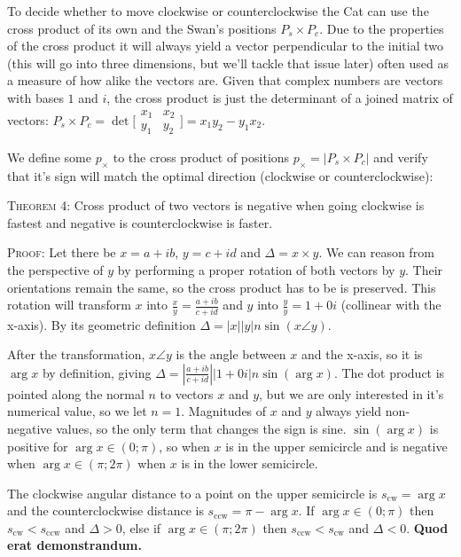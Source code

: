 \documentclass[12pt]{article}
\begin{document}
To decide whether to move clockwise or counterclockwise the Cat can use the cross product of its own and the Swan's positions $P_s \times P_c$. Due to the properties of the cross product it will always yield a vector perpendicular to the initial two (this will go into three dimensions, but we'll tackle that issue later) often used as a measure of how alike the vectors are. Given that complex numbers are vectors with bases $1$ and $i$, the cross product\citep{crossproduct} is just the determinant of a joined matrix of vectors: $P_s \times P_c = \det \bigl[ \begin{smallmatrix} 
	x_1 & x_2\\
	y_1 & y_2 
  \end{smallmatrix} \bigr] = x_1y_2 - y_1x_2$.

We define some $p_\times$ to the cross product of positions $p_\times = |P_s \times P_c|$ and verify that it's sign will match the optimal direction (clockwise or counterclockwise):

\textsc{Theorem 4}: Cross product of two vectors is negative when going clockwise is fastest and negative is counterclockwise is faster.

\textsc{Proof}: 
Let there be $x = a + ib$, $y = c + id$ and $\Delta = x \times y$. We can reason from the perspective of $y$ by performing a proper rotation\citep{rotation} of both vectors by $y$. Their orientations remain the same, so the cross product has to be is preserved. This rotation will transform $x$ into $\frac{x}{y} = \frac{a + ib}{c + id}$ and $y$ into $\frac{y}{y} = 1 + 0i$ (collinear\citep{vectorterminology} with the x-axis). By its geometric definition $\Delta = |x| |y| n \sin (x \angle y)$. 

After the transformation, $x \angle y$ is the angle between $x$ and the x-axis, so it is $\arg x$ by definition, giving $\Delta = |\frac{a + ib}{c + id}| |1 + 0i| n \sin (\arg x)$. The dot product is pointed along the normal $n$ to vectors $x$ and $y$, but we are only interested in it's numerical value, so we let $n = 1$.  Magnitudes of $x$ and $y$ always yield non-negative values, so the only term that changes the sign is sine. $\sin (\arg x)$ is positive for $\arg x \in (0; \pi)$, so when $x$ is in the upper semicircle and is negative when $\arg x \in (\pi; 2\pi)$ when $x$ is in the lower semicircle.

The clockwise angular distance to a point on the upper semicircle is $s_{\text{cw}} = \arg x$ and the counterclockwise distance is $s_\text{ccw} = \pi - \arg x$. If $\arg x \in (0; \pi)$ then $s_\text{cw} < s_\text{ccw}$ and $\Delta > 0$, else if $\arg x \in (\pi; 2\pi)$ then $s_{\text{ccw}} < s_{\text{cw}}$ and $\Delta < 0$. \textbf{Quod erat demonstrandum.}
\end{document}
